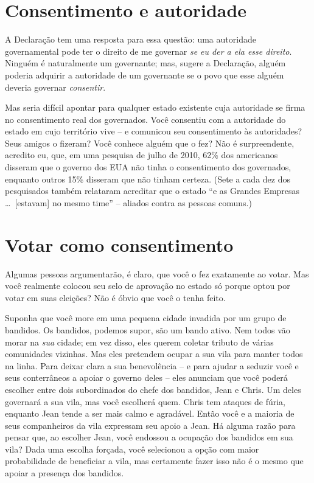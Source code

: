 \section{Consentimento e autoridade}

A Declaração tem uma resposta para essa questão: uma autoridade governamental pode ter o direito de me governar \emph{se eu der a ela esse direito}. Ninguém é naturalmente um governante; mas, sugere a Declaração, alguém poderia adquirir a autoridade de um governante se o povo que esse alguém deveria governar \emph{consentir}.

Mas seria difícil apontar para qualquer estado existente cuja autoridade se firma no consentimento real dos governados. Você consentiu com a autoridade do estado em cujo território vive -- e comunicou seu consentimento às autoridades? Seus amigos o fizeram? Você conhece alguém que o fez? Não é surpreendente, acredito eu, que, em uma pesquisa de julho de 2010, 62\% dos americanos disseram que o governo dos EUA não tinha o consentimento dos governados, enquanto outros 15\% disseram que não tinham certeza. (Sete a cada dez dos pesquisados também relataram acreditar que o estado ``e as Grandes Empresas \ldots\ [estavam] no mesmo time'' -- aliados contra as pessoas comuns.)

\section{Votar como consentimento}

Algumas pessoas argumentarão, é claro, que você o fez exatamente ao votar. Mas você realmente colocou seu selo de aprovação no estado só porque optou por votar em suas eleições? Não é óbvio que você o tenha feito.

Suponha que você more em uma pequena cidade invadida por um grupo de bandidos. Os bandidos, podemos supor, são um bando ativo. Nem todos vão morar na \emph{sua} cidade; em vez disso, eles querem coletar tributo de várias comunidades vizinhas. Mas eles pretendem ocupar a sua vila para manter todos na linha. Para deixar clara a sua benevolência -- e para ajudar a seduzir você e seus conterrâneos a apoiar o governo deles -- eles anunciam que você poderá escolher entre dois subordinados do chefe dos bandidos, Jean e Chris. Um deles governará a sua vila, mas você escolherá quem. Chris tem ataques de fúria, enquanto Jean tende a ser mais calmo e agradável. Então você e a maioria de seus companheiros da vila expressam seu apoio a Jean. Há alguma razão para pensar que, ao escolher Jean, você endossou a ocupação dos bandidos em sua vila? Dada uma escolha forçada, você selecionou a opção com maior probabilidade de beneficiar a vila, mas certamente fazer isso não é o mesmo que apoiar a presença dos bandidos.

